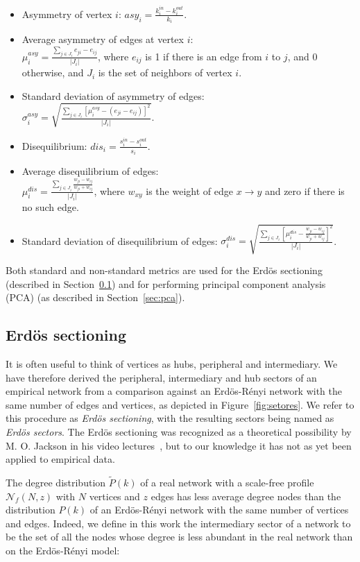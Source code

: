 \begin{itemize}
\item Asymmetry of vertex $i$: $asy_i=\frac{k_i^{in}-k_i^{out}}{k_i}$.
\item Average asymmetry of edges at vertex $i$:\\ $\mu_i^{asy}=\frac{\sum_{j\in J_i} e_{ji}-e_{ij}}{|J_i|}$, where $e_{ij}$ is 1 if there is an edge from $i$ to $j$, and $0$ otherwise, and $J_i$ is the set of neighbors of vertex $i$.
\item Standard deviation of asymmetry of edges:\\ $\sigma_i^{asy}=\sqrt{\frac{\sum_{j\in J_i}[\mu^{asy}_i -(e_{ji}-e_{ij}) ]^2  }{|J_i|}  }$.
\item Disequilibrium: $dis_i=\frac{s_i^{in}-s_i^{out}}{s_i}$.
\item Average disequilibrium of edges:\\ $\mu_i^{dis}=\frac{\sum_{j \in J_i}\frac{w_{ji}-w_{ij}}{w_{ji}+w_{ij}}}{|J_i|}$, where $w_{xy}$ is the weight of edge $x\rightarrow y$ and zero if there is no such edge.
\item Standard deviation of disequilibrium of edges: $\sigma_i^{dis}=\sqrt{\frac{\sum_{j\in J_i}\left[\mu^{dis}_i-\frac{w_{ji}-w_{ij}}{w_{ji}+w_{ij}}\right]^2}{|J_i|}}$.
\end{itemize}

Both standard and non-standard metrics are used for the Erd\"os sectioning (described in Section~\ref{sectioning})
and for performing principal component analysis (PCA) (as described in Section~\ref{sec:pca}).


\subsection{Erd\"os sectioning}\label{sectioning}
It is often useful to think of vertices as hubs, peripheral and intermediary. We have therefore derived the peripheral, intermediary and hub sectors of an empirical network from a comparison against an Erd\"os-R\'enyi network with the same number of edges and vertices,
as depicted in Figure~\ref{fig:setores}. We refer to this procedure as \emph{Erd\"os sectioning}, with the resulting sectors being named as \emph{Erd\"os sectors}. The Erd\"os sectioning was recognized as a theoretical possibility by M. O. Jackson in his video lectures~\cite{3setores}, but to our knowledge it has not as yet been applied to empirical data.

The degree distribution $\widetilde{P}(k)$ of a real network with a scale-free profile $\mathcal{N}_f(N,z)$ with $N$ vertices and $z$ edges has less
average degree nodes than the distribution $P(k)$ of an Erd\"os-R\'enyi
network with the same number of vertices and edges. Indeed, we define in this work the intermediary sector of a network to be the set of all the nodes whose degree is less abundant in the real network than on the Erd\"os-R\'enyi model:

